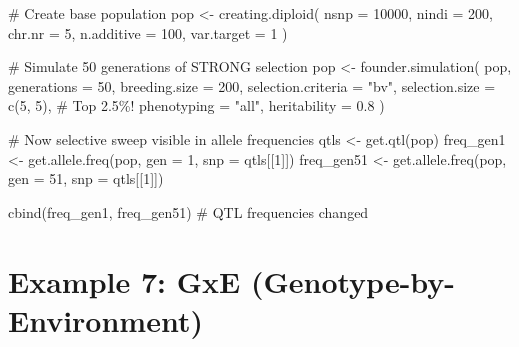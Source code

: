 \documentclass[
  letterpaper,
]{book}
\newenvironment{Shaded}{\begin{snugshade}}{\end{snugshade}}
\newcommand{\AttributeTok}[1]{\textcolor[rgb]{0.40,0.45,0.13}{#1}}
\newcommand{\CommentTok}[1]{\textcolor[rgb]{0.37,0.37,0.37}{#1}}
\newcommand{\DecValTok}[1]{\textcolor[rgb]{0.68,0.00,0.00}{#1}}
\newcommand{\FloatTok}[1]{\textcolor[rgb]{0.68,0.00,0.00}{#1}}
\newcommand{\FunctionTok}[1]{\textcolor[rgb]{0.28,0.35,0.67}{#1}}
\newcommand{\NormalTok}[1]{\textcolor[rgb]{0.00,0.23,0.31}{#1}}
\newcommand{\OtherTok}[1]{\textcolor[rgb]{0.00,0.23,0.31}{#1}}
\newcommand{\StringTok}[1]{\textcolor[rgb]{0.13,0.47,0.30}{#1}}
\begin{document}
\begin{Shaded}
\begin{Highlighting}[]
\CommentTok{\# Create base population}
\NormalTok{pop }\OtherTok{\textless{}{-}} \FunctionTok{creating.diploid}\NormalTok{(}
  \AttributeTok{nsnp =} \DecValTok{10000}\NormalTok{,}
  \AttributeTok{nindi =} \DecValTok{200}\NormalTok{,}
  \AttributeTok{chr.nr =} \DecValTok{5}\NormalTok{,}
  \AttributeTok{n.additive =} \DecValTok{100}\NormalTok{,}
  \AttributeTok{var.target =} \DecValTok{1}
\NormalTok{)}

\CommentTok{\# Simulate 50 generations of STRONG selection}
\NormalTok{pop }\OtherTok{\textless{}{-}} \FunctionTok{founder.simulation}\NormalTok{(}
\NormalTok{  pop,}
  \AttributeTok{generations =} \DecValTok{50}\NormalTok{,}
  \AttributeTok{breeding.size =} \DecValTok{200}\NormalTok{,}
  \AttributeTok{selection.criteria =} \StringTok{"bv"}\NormalTok{,}
  \AttributeTok{selection.size =} \FunctionTok{c}\NormalTok{(}\DecValTok{5}\NormalTok{, }\DecValTok{5}\NormalTok{),      }\CommentTok{\# Top 2.5\%!}
  \AttributeTok{phenotyping =} \StringTok{"all"}\NormalTok{,}
  \AttributeTok{heritability =} \FloatTok{0.8}
\NormalTok{)}

\CommentTok{\# Now selective sweep visible in allele frequencies}
\NormalTok{qtls }\OtherTok{\textless{}{-}} \FunctionTok{get.qtl}\NormalTok{(pop)}
\NormalTok{freq\_gen1 }\OtherTok{\textless{}{-}} \FunctionTok{get.allele.freq}\NormalTok{(pop, }\AttributeTok{gen =} \DecValTok{1}\NormalTok{, }\AttributeTok{snp =}\NormalTok{ qtls[[}\DecValTok{1}\NormalTok{]])}
\NormalTok{freq\_gen51 }\OtherTok{\textless{}{-}} \FunctionTok{get.allele.freq}\NormalTok{(pop, }\AttributeTok{gen =} \DecValTok{51}\NormalTok{, }\AttributeTok{snp =}\NormalTok{ qtls[[}\DecValTok{1}\NormalTok{]])}

\FunctionTok{cbind}\NormalTok{(freq\_gen1, freq\_gen51)  }\CommentTok{\# QTL frequencies changed}
\end{Highlighting}
\end{Shaded}

\section{Example 7: GxE
(Genotype-by-Environment)}\label{sec-example-gxe}
\end{document}
